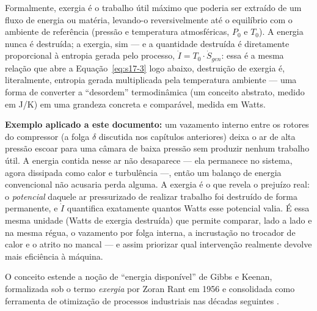 \documentclass[12pt,a4paper]{article}
\numberwithin{equation}{section}
\numberwithin{table}{section}
\numberwithin{figure}{section}
\begin{document}
Formalmente, exergia é o trabalho útil máximo que poderia ser extraído de um fluxo de energia ou matéria, levando-o reversivelmente até o equilíbrio com o ambiente de referência (pressão e temperatura atmosféricas, $P_0$ e $T_0$). A energia nunca é destruída; a exergia, sim — e a quantidade destruída é diretamente proporcional à entropia gerada pelo processo, $\dot{I} = T_0 \cdot \dot{S}_{gen}$: essa é a mesma relação que abre a Equação~\eqref{eq:s17-3} logo abaixo, destruição de exergia é, literalmente, entropia gerada multiplicada pela temperatura ambiente — uma forma de converter a ``desordem'' termodinâmica (um conceito abstrato, medido em J/K) em uma grandeza concreta e comparável, medida em Watts.

\textbf{Exemplo aplicado a este documento:} um vazamento interno entre os rotores do compressor (a folga $\delta$ discutida nos capítulos anteriores) deixa o ar de alta pressão escoar para uma câmara de baixa pressão sem produzir nenhum trabalho útil. A energia contida nesse ar não desaparece — ela permanece no sistema, agora dissipada como calor e turbulência —, então um balanço de energia convencional não acusaria perda alguma. A exergia é o que revela o prejuízo real: o \textit{potencial} daquele ar pressurizado de realizar trabalho foi destruído de forma permanente, e $\dot{I}$ quantifica exatamente quantos Watts esse potencial valia. É essa mesma unidade (Watts de exergia destruída) que permite comparar, lado a lado e na mesma régua, o vazamento por folga interna, a incrustação no trocador de calor e o atrito no mancal — e assim priorizar qual intervenção realmente devolve mais eficiência à máquina.

O conceito estende a noção de ``energia disponível'' de Gibbs e Keenan, formalizada sob o termo \textit{exergia} por Zoran Rant em 1956 e consolidada como ferramenta de otimização de processos industriais nas décadas seguintes \cite{bejan}.
\end{document}
